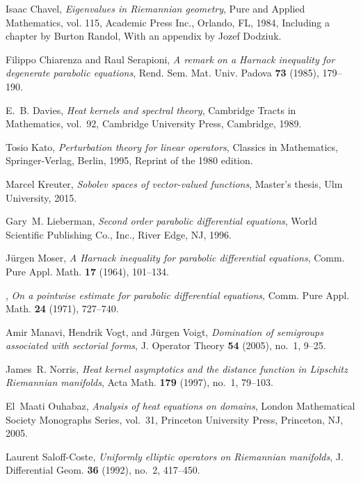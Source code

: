 \begin{thebibliography}{AKM06}
Isaac Chavel, \emph{Eigenvalues in {R}iemannian geometry}, Pure and Applied
  Mathematics, vol. 115, Academic Press Inc., Orlando, FL, 1984, Including a
  chapter by Burton Randol, With an appendix by Jozef Dodziuk. 

Filippo Chiarenza and Raul Serapioni, \emph{A remark on a {H}arnack inequality
  for degenerate parabolic equations}, Rend. Sem. Mat. Univ. Padova \textbf{73}
  (1985), 179--190. 

E.~B. Davies, \emph{Heat kernels and spectral theory}, Cambridge Tracts in
  Mathematics, vol.~92, Cambridge University Press, Cambridge, 1989. 

Tosio Kato, \emph{Perturbation theory for linear operators}, Classics in
  Mathematics, Springer-Verlag, Berlin, 1995, Reprint of the 1980 edition.

Marcel Kreuter, \emph{Sobolev spaces of vector-valued functions}, Master's
  thesis, Ulm University, 2015.

Gary~M. Lieberman, \emph{Second order parabolic differential equations}, World
  Scientific Publishing Co., Inc., River Edge, NJ, 1996. 

J\"urgen Moser, \emph{A {H}arnack inequality for parabolic differential
  equations}, Comm. Pure Appl. Math. \textbf{17} (1964), 101--134. 

\bysame, \emph{On a pointwise estimate for parabolic differential equations},
  Comm. Pure Appl. Math. \textbf{24} (1971), 727--740. 

Amir Manavi, Hendrik Vogt, and J\"urgen Voigt, \emph{Domination of semigroups
  associated with sectorial forms}, J. Operator Theory \textbf{54} (2005),
  no.~1, 9--25. 

James~R. Norris, \emph{Heat kernel asymptotics and the distance function in
  {L}ipschitz {R}iemannian manifolds}, Acta Math. \textbf{179} (1997), no.~1,
  79--103. 

El~Maati Ouhabaz, \emph{Analysis of heat equations on domains}, London
  Mathematical Society Monographs Series, vol.~31, Princeton University Press,
  Princeton, NJ, 2005. 

Laurent Saloff-Coste, \emph{Uniformly elliptic operators on {R}iemannian
  manifolds}, J. Differential Geom. \textbf{36} (1992), no.~2, 417--450.


\end{thebibliography}
